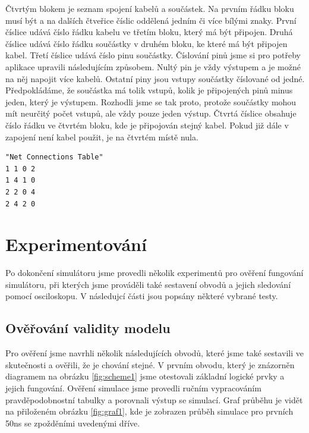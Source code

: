\documentclass[11pt,a4paper]{article}
\begin{document}
			Čtvrtým blokem je seznam spojení kabelů a součástek. Na prvním řádku bloku musí být  a na dalších čtveřice číslic oddělená jedním či více bílými znaky. První číslice udává číslo řádku kabelu ve třetím bloku, který má být připojen. Druhá číslice udává číslo řádku součástky v druhém bloku, ke které má být připojen kabel. Třetí číslice udává číslo pinu součástky. Číslování pinů jsme si pro potřeby aplikace upravili následujícím způsobem. Nultý pin je vždy výstupem a je možné na něj napojit více kabelů. Ostatní piny jsou vstupy součástky číslované od jedné. Předpokládáme, že součástka má tolik vstupů, kolik je připojených pinů minus jeden, který je výstupem. Rozhodli jsme se tak proto, protože součástky mohou mít neurčitý počet vstupů, ale vždy pouze jeden výstup. Čtvrtá číslice obsahuje číslo řádku ve čtvrtém bloku, kde je připojován stejný kabel. Pokud již dále v zapojení není kabel použit, je na čtvrtém místě nula.

\begin{lstlisting}[caption=Příklad bloku propojení]
"Net Connections Table"
1 1 0 2
1 4 1 0
2 2 0 4
2 4 2 0
\end{lstlisting}


	\section{Experimentování}
		Po dokončení simulátoru jsme provedli několik experimentů pro ověření fungování simulátoru, při kterých jsme prováděli také sestavení obvodů a jejich sledování pomocí osciloskopu. V následujcí části jsou popsány některé vybrané testy.

		\subsection{Ověřování validity modelu}
			\label{validity}
			Pro ověření jsme navrhli několik následujících obvodů, které jsme také sestavili ve skutečnosti a ověřili, že je chování stejné. V prvním obvodu, který je znázorněn diagramem na obrázku \ref{fig:scheme1} jsme otestovali základní logické prvky a jejich fungování. Ověření simulace jsme provedli ručním vypracováním pravděpodobnostní tabulky a porovnali výstup se simulací. Graf průběhu je vidět na přiloženém obrázku \ref{fig:graf1}, kde je zobrazen průběh simulace pro prvních 50ns se zpožděními uvedenými dříve.
\end{document}

